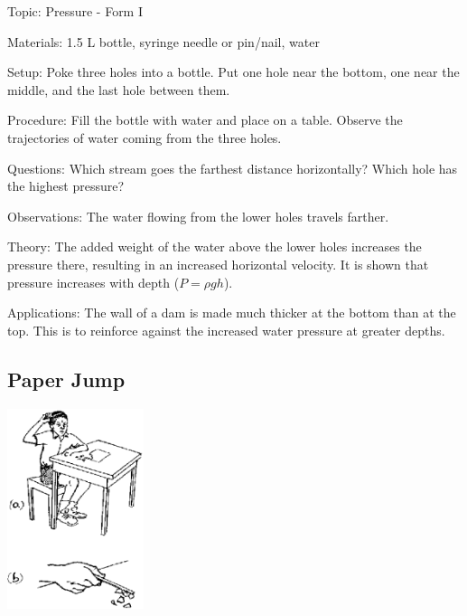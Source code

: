 \begin{multicols}{2}
\begin{description*}
\item[Topic:]{Pressure - Form I}
\item[Materials:]{1.5 L bottle, syringe needle or pin/nail, water}
\item[Setup:]{Poke three holes into a bottle. Put one hole near the bottom, one near the middle, and the last hole between them.}
\item[Procedure:]{Fill the bottle with water and place on a table. Observe the trajectories of water coming from the three holes.}
\item[Questions:]{Which stream goes the farthest distance horizontally? Which hole has the highest pressure?}
\item[Observations:]{The water flowing from the lower holes travels farther.}
\item[Theory:]{The added weight of the water above the lower holes increases the pressure there, resulting in an increased horizontal velocity. It is shown that pressure increases with depth ($P = \rho g h$).}
\item[Applications:]{The wall of a dam is made much thicker at the bottom than at the top. This is to reinforce against the increased water pressure at greater depths.}
\end{description*}

\subsection{Paper Jump}

\begin{center}
\includegraphics[width=0.3\textwidth]{./img/source/static-elec.png}
\end{center}


\end{multicols}
